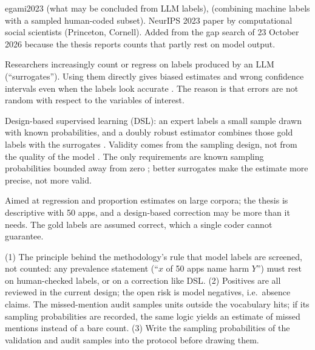 \begin{papercard}{egami2023}
  (what may be concluded from LLM labels),  (combining machine labels with a sampled human-coded subset). NeurIPS 2023 paper by computational social scientists (Princeton, Cornell). Added from the gap search of 23 October 2026 because the thesis reports counts that partly rest on model output.

 Researchers increasingly count or regress on labels produced by an LLM (``surrogates''). Using them directly gives biased estimates and wrong confidence intervals even when the labels look accurate . The reason is that errors are not random with respect to the variables of interest.

 Design-based supervised learning (DSL): an expert labels a small sample drawn with known probabilities, and a doubly robust estimator combines those gold labels with the surrogates . Validity comes from the sampling design, not from the quality of the model . The only requirements are known sampling probabilities bounded away from zero ; better surrogates make the estimate more precise, not more valid.

 Aimed at regression and proportion estimates on large corpora; the thesis is descriptive with 50 apps, and a design-based correction may be more than it needs. The gold labels are assumed correct, which a single coder cannot guarantee.

 (1) The principle behind the methodology's rule that model labels are screened, not counted: any prevalence statement (``$x$ of 50 apps name harm $Y$'') must rest on human-checked labels, or on a correction like DSL. (2) Positives are all reviewed in the current design; the open risk is model negatives, i.e.\ absence claims. The missed-mention audit samples units outside the vocabulary hits; if its sampling probabilities are recorded, the same logic yields an estimate of missed mentions instead of a bare count. (3) Write the sampling probabilities of the validation and audit samples into the protocol before drawing them.
\end{papercard}
